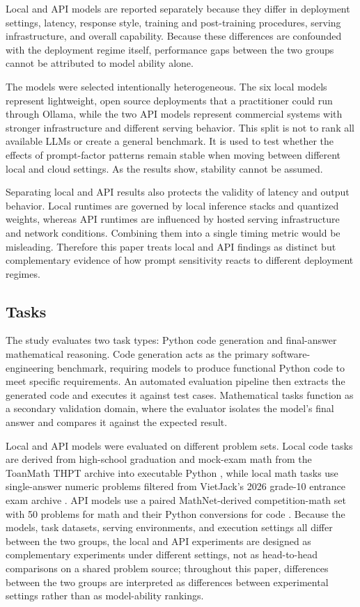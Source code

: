 \documentclass{llncs}
\begin{document}
Local and API models are reported separately because they differ in deployment settings, latency, response style, training and post-training procedures, serving infrastructure, and overall capability. Because these differences are confounded with the deployment regime itself, performance gaps between the two groups cannot be attributed to model ability alone.

The models were selected intentionally heterogeneous. The six local models represent lightweight, open source deployments that a practitioner could run through Ollama, while the two API models represent commercial systems with stronger infrastructure and different serving behavior. This split is not to rank all available LLMs or create a general benchmark. It is used to test whether the effects of prompt-factor patterns remain stable when moving between different local and cloud settings. As the results show, stability cannot be assumed.

Separating local and API results also protects the validity of latency and output behavior. Local runtimes are governed by local inference stacks and quantized weights, whereas API runtimes are influenced by hosted serving infrastructure and network conditions. Combining them into a single timing metric would be misleading. Therefore this paper treats local and API findings as distinct but complementary evidence of how prompt sensitivity reacts to different deployment regimes.

\subsection{Tasks}\label{tasks}

The study evaluates two task types: Python code generation and final-answer mathematical reasoning. Code generation acts as the primary software-engineering benchmark, requiring models to produce functional Python code to meet specific requirements. An automated evaluation pipeline then extracts the generated code and executes it against test cases. Mathematical tasks function as a secondary validation domain, where the evaluator isolates the model's final answer and compares it against the expected result.

Local and API models were evaluated on different problem sets. Local code tasks are derived from high-school graduation and mock-exam math from the ToanMath THPT archive into executable Python \citep{toanmath2026thpt, vnschoolmath2026code}, while local math tasks use single-answer numeric problems filtered from VietJack’s 2026 grade-10 entrance exam archive \citep{vietjack2026onvao10, vietjack2026math}. API models use a paired MathNet-derived competition-math set with 50 problems for math \citep{bigmodelmathv5} and their Python conversions for code \citep{bigmodelpythonv7}. Because the models, task datasets, serving environments, and execution settings all differ between the two groups, the local and API experiments are designed as complementary experiments under different settings, not as head-to-head comparisons on a shared problem source; throughout this paper, differences between the two groups are interpreted as differences between experimental settings rather than as model-ability rankings.
\end{document}
